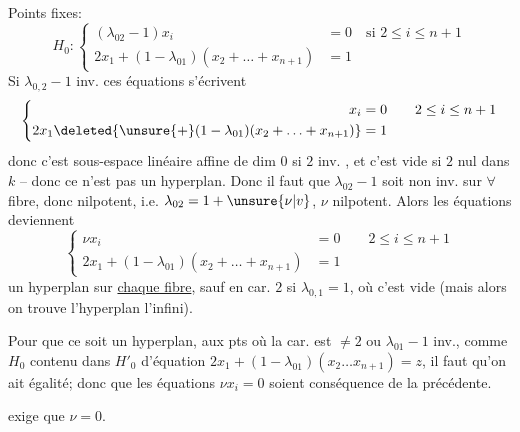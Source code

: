 Points fixes:
\[
H_0:\left\{\begin{aligned}(\lambda_{02}-1)x_i&=0\quad\text{si }2\leq i\leq n+1\\2x_1+(1-\lambda_{01})(x_2+\ldots+x_{n+1})&=1\end{aligned}\right.
\]
 Si $\lambda_{0,2}-1$ inv. ces équations s'écrivent 
\[
\left\{\begin{aligned}x_i&=0\qquad2\leq i\leq n+1\\2x_1\deleted{\unsure{+}(1-\lambda_{01})(x_2+\ldots+x_{n+1})}&=1\end{aligned}\right.
\]
donc c'est  sous-espace linéaire affine de dim $0$  si $2$ inv. , et c'est vide si $2$ nul dans $k$  -- donc ce n'est pas un hyperplan. Donc il faut que $\lambda_{02}-1$ soit non inv.  sur $\forall$ fibre, donc nilpotent, i.e. $\lambda_{02}=1+\unsure{\nu|v}$, $\nu$ nilpotent. Alors les équations deviennent
\[
\left\{\begin{aligned}\nu x_i&=0\qquad2\leq i\leq n+1\\2x_1+(1-\lambda_{01})(x_2+\ldots+x_{n+1})&=1\end{aligned}\right.
\]
 un hyperplan sur \uline{chaque fibre}, sauf en  car. $2$ si $\lambda_{0,1}=1$, où c'est vide (mais alors on trouve l'hyperplan  l'infini).


Pour que ce soit un hyperplan,   aux pts où la car. est $\neq2$  ou $\lambda_{01}-1$ inv., comme  $H_0$ contenu dans $H'_0$ d'équation $2x_1+(1-\lambda_{01})(x_2\ldots x_{n+1})=z$, il faut qu'on ait égalité; donc que les équations $\nu x_i=0$  soient conséquence de la précédente.

  exige  que $\nu=0$.

